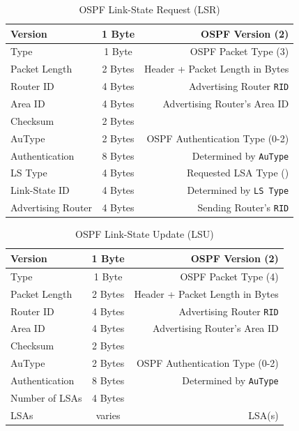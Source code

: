 \documentclass[12pt]{article}
\begin{document}
	\begin{table}[H]
	\centering
	\caption{OSPF Link-State Request (LSR) \label{tab:OSPF LSR}}
	\begin{tabular}{| l | c | r |}\hline
	Version			& 1 Byte	& OSPF Version (2)\\\hline
	Type				& 1 Byte	& OSPF Packet Type (3)\\\hline
	Packet Length		& 2 Bytes	& Header + Packet Length in Bytes\\\hline
	Router ID			& 4 Bytes	& Advertising Router \texttt{RID}\\\hline
	Area ID			& 4 Bytes	& Advertising Router's Area ID\\\hline
	Checksum			& 2 Bytes	&\\\hline
	AuType			& 2 Bytes	& OSPF Authentication Type (0-2)\\\hline
	Authentication		& 8 Bytes	& Determined by \texttt{AuType}\\\hline
	LS Type			& 4 Bytes	& Requested LSA Type (\Cref{tab:OSPF LSA TYPES})\\\hline
	Link-State ID		& 4 Bytes	& Determined by \texttt{LS Type}\\\hline
	Advertising Router	& 4 Bytes	& Sending Router's \texttt{RID}\\\hline
	\end{tabular}\end{table}

	\begin{table}[H]
	\centering
	\caption{OSPF Link-State Update (LSU) \label{tab:OSPF LSU}}
	\begin{tabular}{| l | c | r |}\hline
	Version		& 1 Byte	& OSPF Version (2)\\\hline
	Type			& 1 Byte	& OSPF Packet Type (4)\\\hline
	Packet Length	& 2 Bytes	& Header + Packet Length in Bytes\\\hline
	Router ID		& 4 Bytes	& Advertising Router \texttt{RID}\\\hline
	Area ID		& 4 Bytes	& Advertising Router's Area ID\\\hline
	Checksum		& 2 Bytes	&\\\hline
	AuType		& 2 Bytes	& OSPF Authentication Type (0-2)\\\hline
	Authentication	& 8 Bytes	& Determined by \texttt{AuType}\\\hline
	Number of LSAs	& 4 Bytes	&\\\hline
	LSAs			& varies	& LSA(s)\\\hline
	\end{tabular}\end{table}
\end{document}
